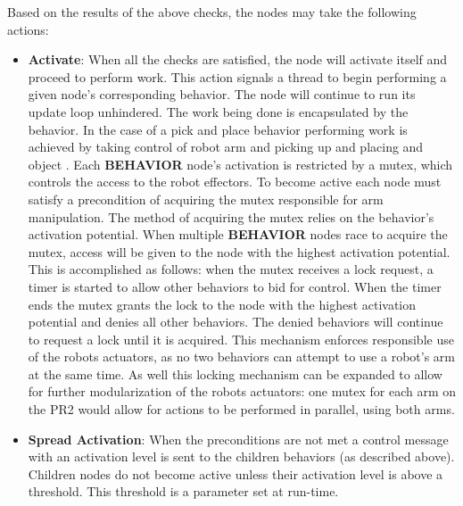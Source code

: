 \documentclass[conference]{article}
\begin{document}
  Based on the results of the above checks, the nodes may take the following actions:
  \begin{itemize}
  \item \textbf{Activate}: When all the checks are satisfied, the node will activate itself and proceed to perform work. 
  This action signals a thread to begin performing a given node's corresponding behavior. The node will continue to run its update loop unhindered. The work being done is encapsulated by the behavior. In the case of a pick and place behavior performing work is achieved by taking control of robot arm and picking up and placing and object
  .
Each {\bf BEHAVIOR} node's activation is restricted by a mutex, which controls the access to the robot effectors. To become active each node must satisfy a precondition of acquiring the mutex responsible for arm manipulation. The method of acquiring the mutex relies on the behavior's activation potential. When multiple {\bf BEHAVIOR} nodes race to acquire the mutex, access will be given to the node with the highest activation potential. This is accomplished as follows: when the mutex receives a lock request, a timer is started to allow other behaviors to bid for control. When the timer ends the mutex grants the lock to the node with the highest activation potential and denies all other behaviors. The denied behaviors will continue to request a lock until it is acquired. This mechanism enforces responsible use of the robots actuators, as no two behaviors can attempt to use a robot's arm at the same time. As well this locking mechanism can be expanded to allow for further modularization of the robots actuators: one mutex for each arm on the PR2 would allow for actions to be performed in parallel, using both arms.
  
  
  \item \textbf{Spread Activation}: When the preconditions are not met a control message with an activation level is sent to the children behaviors (as described above). Children nodes do not become active unless their activation level is above a threshold. This threshold is a parameter set at run-time.
  

\end{itemize}
\end{document}
